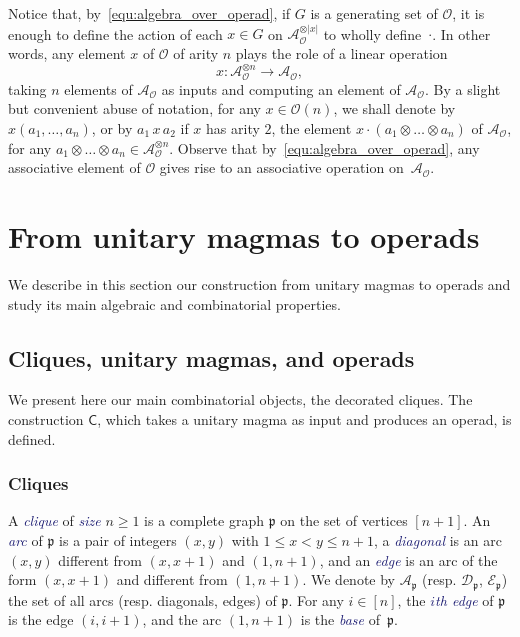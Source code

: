 \documentclass[10pt,reqno]{amsart}
\numberwithin{equation}{subsection}
\renewcommand{\leq}{\leqslant}
\renewcommand{\geq}{\geqslant}
\newcommand{\Aca}{\mathcal{A}}
\newcommand{\Oca}{\mathcal{O}}
\newcommand{\Pfr}{\mathfrak{p}}
\newcommand{\Cli}{\mathsf{C}}
\newcommand{\Arcs}{\mathcal{A}}
\newcommand{\Diagonals}{\mathcal{D}}
\newcommand{\Edges}{\mathcal{E}}
\newcommand{\Alg}{\Aca}
\newcommand{\Def}[1]{\textcolor{MidnightBlue}{\em #1}}
\begin{document}
Notice that, by~\eqref{equ:algebra_over_operad}, if $G$ is a generating
set of $\Oca$, it is enough to define the action of each $x \in G$ on
$\Alg_\Oca^{\otimes |x|}$ to wholly define~$\cdot$. In other words, any
element $x$ of $\Oca$ of arity $n$ plays the role of a linear operation
\begin{equation}
    x : \Alg_\Oca^{\otimes n}  \to \Alg_\Oca,
\end{equation}
taking $n$ elements of $\Alg_\Oca$ as inputs and computing an element of
$\Alg_\Oca$. By a slight but convenient abuse of notation, for any
$x \in \Oca(n)$, we shall denote by $x(a_1, \dots, a_n)$, or by
$a_1 \, x \, a_2$ if $x$ has arity $2$, the element
$x \cdot (a_1 \otimes \dots \otimes a_n)$ of $\Alg_\Oca$, for any
$a_1 \otimes \dots \otimes a_n \in \Alg_\Oca^{\otimes n}$. Observe that
by~\eqref{equ:algebra_over_operad}, any associative element of $\Oca$
gives rise to an associative operation on~$\Alg_\Oca$.
\medskip

\section{From unitary magmas to operads}\label{sec:construction_Cli}
We describe in this section our construction from unitary magmas to
operads and study its main algebraic and combinatorial properties.
\medskip

\subsection{Cliques, unitary magmas, and operads}%
\label{subsec:decorated_cliques}
We present here our main combinatorial objects, the decorated cliques.
The construction $\Cli$, which takes a unitary magma as input and
produces an operad, is defined.
\medskip

\subsubsection{Cliques}
\label{subsec:cliques}
A \Def{clique} of \Def{size} $n \geq 1$ is a complete graph $\Pfr$ on
the set of vertices $[n + 1]$. An \Def{arc} of $\Pfr$ is a pair of
integers $(x, y)$ with $1 \leq x < y \leq n + 1$, a \Def{diagonal} is
an arc $(x, y)$ different from $(x, x + 1)$ and $(1, n + 1)$, and an
\Def{edge} is an arc of the form $(x, x + 1)$ and different from
$(1, n + 1)$. We denote by $\Arcs_\Pfr$ (resp. $\Diagonals_\Pfr$,
$\Edges_\Pfr$) the set of all arcs (resp. diagonals, edges) of $\Pfr$.
For any $i \in [n]$, the \Def{$i$th edge} of $\Pfr$ is the edge
$(i, i + 1)$, and the arc $(1, n + 1)$ is the \Def{base} of~$\Pfr$.
\medskip
\end{document}
